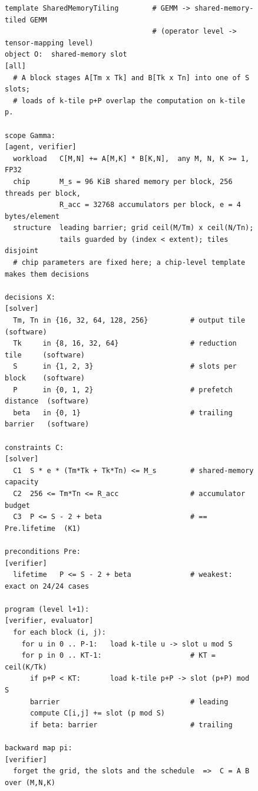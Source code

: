 \documentclass[11pt]{article}
\begin{document}
\begin{figure}[tp]
\begin{framed}
\footnotesize
\begin{verbatim}
template SharedMemoryTiling        # GEMM -> shared-memory-tiled GEMM
                                   # (operator level -> tensor-mapping level)
object O:  shared-memory slot                                          [all]
  # A block stages A[Tm x Tk] and B[Tk x Tn] into one of S slots;
  # loads of k-tile p+P overlap the computation on k-tile p.

scope Gamma:                                               [agent, verifier]
  workload   C[M,N] += A[M,K] * B[K,N],  any M, N, K >= 1,  FP32
  chip       M_s = 96 KiB shared memory per block, 256 threads per block,
             R_acc = 32768 accumulators per block, e = 4 bytes/element
  structure  leading barrier; grid ceil(M/Tm) x ceil(N/Tn);
             tails guarded by (index < extent); tiles disjoint
  # chip parameters are fixed here; a chip-level template makes them decisions

decisions X:                                                        [solver]
  Tm, Tn in {16, 32, 64, 128, 256}          # output tile        (software)
  Tk     in {8, 16, 32, 64}                 # reduction tile     (software)
  S      in {1, 2, 3}                       # slots per block    (software)
  P      in {0, 1, 2}                       # prefetch distance  (software)
  beta   in {0, 1}                          # trailing barrier   (software)

constraints C:                                                      [solver]
  C1  S * e * (Tm*Tk + Tk*Tn) <= M_s        # shared-memory capacity
  C2  256 <= Tm*Tn <= R_acc                 # accumulator budget
  C3  P <= S - 2 + beta                     # == Pre.lifetime  (K1)

preconditions Pre:                                                [verifier]
  lifetime   P <= S - 2 + beta              # weakest: exact on 24/24 cases

program (level l+1):                                   [verifier, evaluator]
  for each block (i, j):
    for u in 0 .. P-1:   load k-tile u -> slot u mod S
    for p in 0 .. KT-1:                     # KT = ceil(K/Tk)
      if p+P < KT:       load k-tile p+P -> slot (p+P) mod S
      barrier                               # leading
      compute C[i,j] += slot (p mod S)
      if beta: barrier                      # trailing

backward map pi:                                                  [verifier]
  forget the grid, the slots and the schedule  =>  C = A B over (M,N,K)


\end{verbatim}
\end{framed}
\end{figure}
\end{document}
